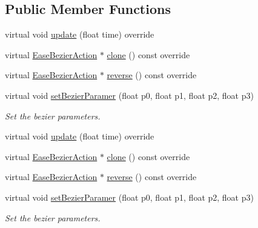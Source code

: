 \subsection*{Public Member Functions}
\begin{DoxyCompactItemize}
\item 
virtual void \hyperlink{classEaseBezierAction_a8961e1604d79493c815dc42714261403}{update} (float time) override
\item 
virtual \hyperlink{classEaseBezierAction}{Ease\+Bezier\+Action} $\ast$ \hyperlink{classEaseBezierAction_a8d25557473e4f02ab18fe846ed193e06}{clone} () const override
\item 
virtual \hyperlink{classEaseBezierAction}{Ease\+Bezier\+Action} $\ast$ \hyperlink{classEaseBezierAction_ad6a92ab332d64dcdbbd3b7db4cf2464c}{reverse} () const override
\item 
\mbox{\label{classEaseBezierAction_a0e13a71652076ffb2ee7bf599448b2ac}} 
virtual void \hyperlink{classEaseBezierAction_a0e13a71652076ffb2ee7bf599448b2ac}{set\+Bezier\+Paramer} (float p0, float p1, float p2, float p3)
\begin{DoxyCompactList}\small\item\em Set the bezier parameters. \end{DoxyCompactList}\item 
virtual void \hyperlink{classEaseBezierAction_aea1d8017627effcd9ad5d228d3e764f1}{update} (float time) override
\item 
virtual \hyperlink{classEaseBezierAction}{Ease\+Bezier\+Action} $\ast$ \hyperlink{classEaseBezierAction_ae097f3480deee8064133c6e479c45020}{clone} () const override
\item 
virtual \hyperlink{classEaseBezierAction}{Ease\+Bezier\+Action} $\ast$ \hyperlink{classEaseBezierAction_abf78e7a531e29240728c85b1d1aa0c6b}{reverse} () const override
\item 
\mbox{\label{classEaseBezierAction_aa150b7f9c2e0b95d38af9ad3c16c78b0}} 
virtual void \hyperlink{classEaseBezierAction_aa150b7f9c2e0b95d38af9ad3c16c78b0}{set\+Bezier\+Paramer} (float p0, float p1, float p2, float p3)
\begin{DoxyCompactList}\small\item\em Set the bezier parameters. \end{DoxyCompactList}\end{DoxyCompactItemize}
